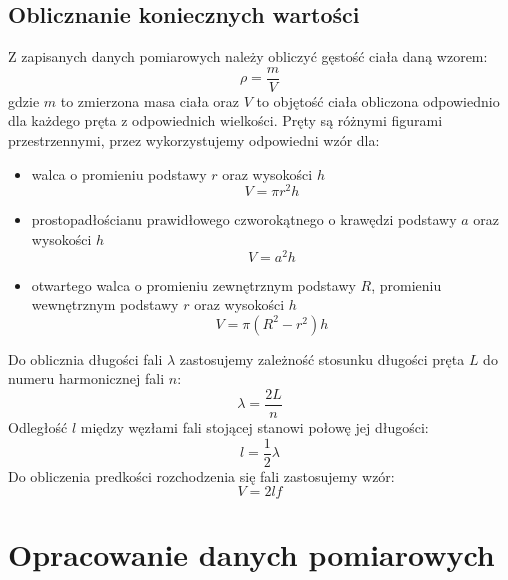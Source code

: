 \documentclass[a4paper,12pts]{article}
\begin{document}
\subsection{Oblicznanie koniecznych wartości}
Z zapisanych danych pomiarowych należy obliczyć gęstość ciała daną wzorem:
\begin{equation}
\rho = \frac{m}{V}
\end{equation}
gdzie $m$ to zmierzona masa ciała oraz $V$ to objętość ciała obliczona odpowiednio dla każdego pręta z odpowiednich wielkości. Pręty są różnymi figurami przestrzennymi, przez wykorzystujemy odpowiedni wzór dla:
\begin{itemize}
	\item walca o promieniu podstawy $r$ oraz wysokości $h$
	\begin{equation}
	V = \pi r^2 h
	\end{equation}
	
	\item prostopadłościanu prawidłowego czworokątnego o krawędzi podstawy $a$ oraz wysokości $h$
	\begin{equation}
	V = a^2 h
	\end{equation}
	
	\item otwartego walca o promieniu zewnętrznym podstawy $R$, promieniu wewnętrznym podstawy $r$ oraz wysokości $h$
	\begin{equation}
	V = \pi (R^2 - r^2) h
	\end{equation}
\end{itemize}
Do oblicznia długości fali $\lambda$ zastosujemy zależność stosunku długości pręta $L$ do numeru harmonicznej fali $n$:
\begin{equation}
\lambda = \frac{2L}{n}
\end{equation}
Odległość $l$ między węzłami fali stojącej stanowi połowę jej długości:
\begin{equation}
l = \frac{1}{2} \lambda
\end{equation}
Do obliczenia predkości rozchodzenia się fali zastosujemy wzór:
\begin{equation}
V = 2lf
\end{equation}
\newpage
	
	\section{Opracowanie danych pomiarowych}
	
\end{document}
